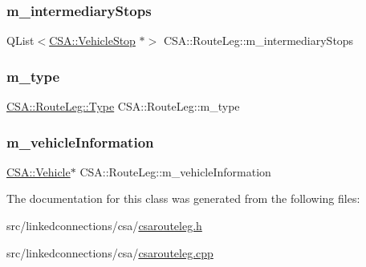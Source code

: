\mbox{\label{classCSA_1_1RouteLeg_adb7b64dcb19e7358d822ff807d1e8a52}} 
\subsubsection{\texorpdfstring{m\+\_\+intermediary\+Stops}{m\_intermediaryStops}}
{\footnotesize\ttfamily Q\+List$<$\mbox{\hyperlink{classCSA_1_1VehicleStop}{C\+S\+A\+::\+Vehicle\+Stop}} $\ast$$>$ C\+S\+A\+::\+Route\+Leg\+::m\+\_\+intermediary\+Stops\hspace{0.3cm}{\ttfamily [private]}}

\mbox{\label{classCSA_1_1RouteLeg_afa6addf2a813318e92228221f8588e36}} 
\subsubsection{\texorpdfstring{m\+\_\+type}{m\_type}}
{\footnotesize\ttfamily \mbox{\hyperlink{classCSA_1_1RouteLeg_a464547cf160a77a2014d101560b1f77b}{C\+S\+A\+::\+Route\+Leg\+::\+Type}} C\+S\+A\+::\+Route\+Leg\+::m\+\_\+type\hspace{0.3cm}{\ttfamily [private]}}

\mbox{\label{classCSA_1_1RouteLeg_a6386eed3d1176ed734ca3fdc589cb90f}} 
\subsubsection{\texorpdfstring{m\+\_\+vehicle\+Information}{m\_vehicleInformation}}
{\footnotesize\ttfamily \mbox{\hyperlink{classCSA_1_1Vehicle}{C\+S\+A\+::\+Vehicle}}$\ast$ C\+S\+A\+::\+Route\+Leg\+::m\+\_\+vehicle\+Information\hspace{0.3cm}{\ttfamily [private]}}



The documentation for this class was generated from the following files\+:\begin{DoxyCompactItemize}
\item 
src/linkedconnections/csa/\mbox{\hyperlink{csarouteleg_8h}{csarouteleg.\+h}}\item 
src/linkedconnections/csa/\mbox{\hyperlink{csarouteleg_8cpp}{csarouteleg.\+cpp}}\end{DoxyCompactItemize}
